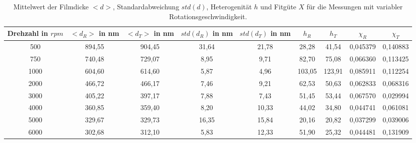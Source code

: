 \begin{table}[h!]
\centering
\begin{tabular}{|c|c|c|c|c|c|c|c|c|}
    \hline
    \makecell{Drehzahl\\in $rpm$} & \makecell{$<d_R>$\\in nm} & \makecell{$<d_T>$\\in nm} & \makecell{$std(d_R)$\\in nm} & \makecell{$std(d_T)$\\in nm} & $h_R$ & $h_T$ & $\chi_R$ & $\chi_T$ \\ [0.5ex]
    \hline \hline
   500 & 894,55 & 904,45 &31,64 & 21,78 & 28,28 & 41,54 & 0,045379 & 0,140883 \\
   750 & 740,48 & 729,07& 8,95 & 9,71 & 82,70 & 75,08 & 0,066360 & 0,113425 \\
   1000 & 604,60 & 614,60 & 5,87 & 4,96 & 103,05 & 123,91 & 0,085911 & 0,112254 \\
   2000 & 466,72 & 466,17 & 7,46 & 9,21 & 62,53 & 50,63 & 0,062833 & 0,068316 \\
   3000 & 405,22 & 397,17 & 7,88 & 7,43 & 51,45 & 53,44 & 0,067570 & 0,029994 \\
   4000 & 360,85 & 359,40 & 8,20 & 10,33 & 44,02 & 34,80 & 0,044741 & 0,061081 \\
   5000 & 329,67 & 329,73 & 16,35 & 15,84 & 20,16 & 20,82 & 0,037299 & 0,039006 \\
   6000 & 302,68 & 312,10 & 5,83 & 12,33 & 51,90 & 25,32 & 0,044481 & 0,131909 \\ [1ex]
   \hline
   \end{tabular}
   \caption{Mittelwert der Filmdicke $<d>$, Standardabweichung $std(d)$, Heterogenität $h$ und Fitgüte $X$ für die Messungen mit variabler Rotationsgeschwindigkeit.}
   \label{tab:rpm_val}
\end{table}

